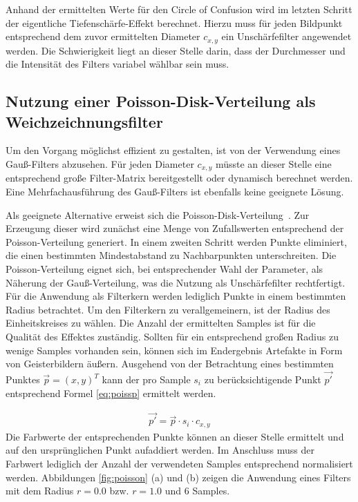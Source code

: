 \documentclass{acmsiggraph}                     %
\begin{document}
Anhand der ermittelten Werte für den Circle of Confusion wird im letzten Schritt der eigentliche Tiefenschärfe-Effekt berechnet. Hierzu muss für jeden Bildpunkt entsprechend dem zuvor ermittelten Diameter $c_{x,y}$ ein Unschärfefilter angewendet werden. Die Schwierigkeit liegt an dieser Stelle darin, dass der Durchmesser und die Intensität des Filters variabel wählbar sein muss.

\subsection{Nutzung einer Poisson-Disk-Verteilung als Weichzeichnungsfilter}

Um den Vorgang möglichst effizient zu gestalten, ist von der Verwendung eines Gauß-Filters abzusehen. Für jeden Diameter $c_{x,y}$ müsste an dieser Stelle eine entsprechend große Filter-Matrix bereitgestellt oder dynamisch berechnet werden. Eine Mehrfachausführung des Gauß-Filters ist ebenfalls keine geeignete Lösung.

Als geeignete Alternative erweist sich die Poisson-Disk-Verteilung~\cite{Engel:2004uq}. Zur Erzeugung dieser wird zunächst eine Menge von Zufallswerten entsprechend der Poisson-Verteilung generiert. In einem zweiten Schritt werden Punkte eliminiert, die einen bestimmten Mindestabstand zu Nachbarpunkten unterschreiten. Die Poisson-Verteilung eignet sich, bei entsprechender Wahl der Parameter, als Näherung der Gauß-Verteilung, was die Nutzung als Unschärfefilter rechtfertigt. Für die Anwendung als Filterkern werden lediglich Punkte in einem bestimmten Radius betrachtet. Um den Filterkern zu verallgemeinern, ist der Radius des Einheitskreises zu wählen. Die Anzahl der ermittelten Samples ist für die Qualität des Effektes zuständig. Sollten für ein entsprechend großen Radius zu wenige Samples vorhanden sein, können sich im Endergebnis Artefakte in Form von Geisterbildern äußern.
Ausgehend von der Betrachtung eines bestimmten Punktes $\vec{p} = \left(x,y\right)^T$ kann der pro Sample $s_{i}$ zu berücksichtigende Punkt $\vec{p'}$ entsprechend Formel \ref{eq:poissp} ermittelt werden.

\begin{align}
	 \label{eq:poissp}
	\vec{p'} = \vec{p} \cdot s_i \cdot c_{x,y}
\end{align}
Die Farbwerte der entsprechenden Punkte können an dieser Stelle ermittelt und auf den ursprünglichen Punkt aufaddiert werden. Im Anschluss muss der Farbwert lediglich der Anzahl der verwendeten Samples entsprechend normalisiert werden. Abbildungen \ref{fig:poisson} (a) und (b) zeigen die Anwendung eines Filters mit dem Radius $r = 0.0$ bzw. $r = 1.0$ und 6 Samples.
\end{document}

